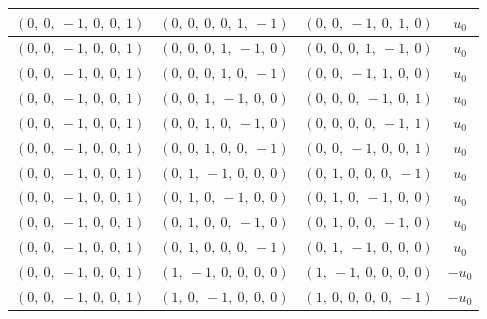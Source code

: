 \documentclass[11pt]{article}
\theoremstyle{definition}
\begin{document}
\begin{longtable}{|l|l|l|c|}
    \hline
    $\left( 0, \  0, \  -1, \  0, \  0, \  1\right)$ & $\left( 0, \  0, \  0, \  0, \  1, \  -1\right)$ & $\left( 0, \  0, \  -1, \  0, \  1, \  0\right)$ & $u_{0}$ \\
    \hline
    $\left( 0, \  0, \  -1, \  0, \  0, \  1\right)$ & $\left( 0, \  0, \  0, \  1, \  -1, \  0\right)$ & $\left( 0, \  0, \  0, \  1, \  -1, \  0\right)$ & $u_{0}$ \\
    \hline
    $\left( 0, \  0, \  -1, \  0, \  0, \  1\right)$ & $\left( 0, \  0, \  0, \  1, \  0, \  -1\right)$ & $\left( 0, \  0, \  -1, \  1, \  0, \  0\right)$ & $u_{0}$ \\
    \hline
    $\left( 0, \  0, \  -1, \  0, \  0, \  1\right)$ & $\left( 0, \  0, \  1, \  -1, \  0, \  0\right)$ & $\left( 0, \  0, \  0, \  -1, \  0, \  1\right)$ & $u_{0}$ \\
    \hline
    $\left( 0, \  0, \  -1, \  0, \  0, \  1\right)$ & $\left( 0, \  0, \  1, \  0, \  -1, \  0\right)$ & $\left( 0, \  0, \  0, \  0, \  -1, \  1\right)$ & $u_{0}$ \\
    \hline
    $\left( 0, \  0, \  -1, \  0, \  0, \  1\right)$ & $\left( 0, \  0, \  1, \  0, \  0, \  -1\right)$ & $\left( 0, \  0, \  -1, \  0, \  0, \  1\right)$ & $u_{0}$ \\
    \hline
    $\left( 0, \  0, \  -1, \  0, \  0, \  1\right)$ & $\left( 0, \  1, \  -1, \  0, \  0, \  0\right)$ & $\left( 0, \  1, \  0, \  0, \  0, \  -1\right)$ & $u_{0}$ \\
    \hline
    $\left( 0, \  0, \  -1, \  0, \  0, \  1\right)$ & $\left( 0, \  1, \  0, \  -1, \  0, \  0\right)$ & $\left( 0, \  1, \  0, \  -1, \  0, \  0\right)$ & $u_{0}$ \\
    \hline
    $\left( 0, \  0, \  -1, \  0, \  0, \  1\right)$ & $\left( 0, \  1, \  0, \  0, \  -1, \  0\right)$ & $\left( 0, \  1, \  0, \  0, \  -1, \  0\right)$ & $u_{0}$ \\
    \hline
    $\left( 0, \  0, \  -1, \  0, \  0, \  1\right)$ & $\left( 0, \  1, \  0, \  0, \  0, \  -1\right)$ & $\left( 0, \  1, \  -1, \  0, \  0, \  0\right)$ & $u_{0}$ \\
    \hline
    $\left( 0, \  0, \  -1, \  0, \  0, \  1\right)$ & $\left( 1, \  -1, \  0, \  0, \  0, \  0\right)$ & $\left( 1, \  -1, \  0, \  0, \  0, \  0\right)$ & $- u_{0}$ \\
    \hline
    $\left( 0, \  0, \  -1, \  0, \  0, \  1\right)$ & $\left( 1, \  0, \  -1, \  0, \  0, \  0\right)$ & $\left( 1, \  0, \  0, \  0, \  0, \  -1\right)$ & $- u_{0}$ \\

\end{longtable}
\end{document}
